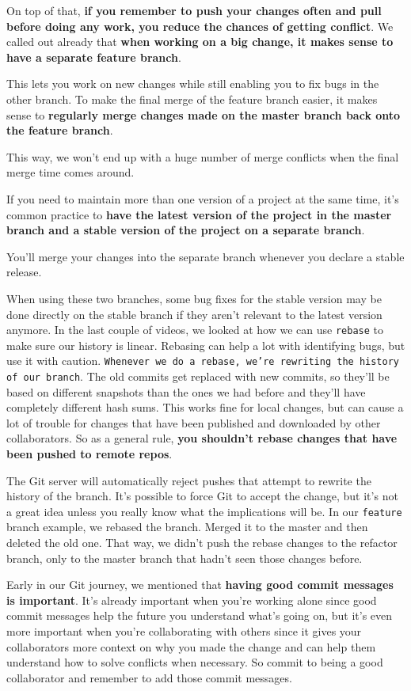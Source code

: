 	On top of that, \textbf{if you remember to push your changes often and pull before doing any work, you reduce the chances of getting conflict}. We called out already that \textbf{when working on a big change, it makes sense to have a separate feature branch}.
	
	This lets you work on new changes while still enabling you to fix bugs in the other branch. To make the final merge of the feature branch easier, it makes sense to \textbf{regularly merge changes made on the master branch back onto the feature branch}.
	
	This way, we won't end up with a huge number of merge conflicts when the final merge time comes around.
	
	If you need to maintain more than one version of a project at the same time, it's common practice to \textbf{have the latest version of the project in the master branch and a stable version of the project on a separate branch}.
	
	You'll merge your changes into the separate branch whenever you declare a stable release.
	
	When using these two branches, some bug fixes for the stable version may be done directly on the stable branch if they aren't relevant to the latest version anymore. In the last couple of videos, we looked at how we can use \texttt{rebase} to make sure our history is linear. Rebasing can help a lot with identifying bugs, but use it with caution. \texttt{Whenever we do a rebase, we're rewriting the history of our branch}. The old commits get replaced with new commits, so they'll be based on different snapshots than the ones we had before and they'll have completely different hash sums. This works fine for local changes, but can cause a lot of trouble for changes that have been published and downloaded by other collaborators. So as a general rule, \textbf{you shouldn't rebase changes that have been pushed to remote repos}.
	
	The Git server will automatically reject pushes that attempt to rewrite the history of the branch. It's possible to force Git to accept the change, but it's not a great idea unless you really know what the implications will be. In our \texttt{feature} branch example, we rebased the branch. Merged it to the master and then deleted the old one. That way, we didn't push the rebase changes to the refactor branch, only to the master branch that hadn't seen those changes before.
	
	Early in our Git journey, we mentioned that \textbf{having good commit messages is important}. It's already important when you're working alone since good commit messages help the future you understand what's going on, but it's even more important when you're collaborating with others since it gives your collaborators more context on why you made the change and can help them understand how to solve conflicts when necessary. So commit to being a good collaborator and remember to add those commit messages.
	
